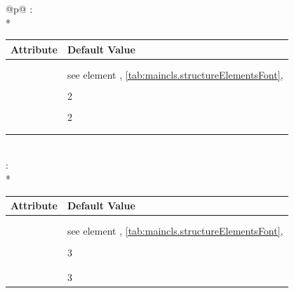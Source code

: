 \begin{longtable}{@{}p{\columnwidth}@{}}
    \addlinespace[\normalbaselineskip]
    : \\*
    \begin{tabularx}{\linewidth}{ll}
    \toprule
    Attribute & Default Value \\
    \midrule\nopagebreak
    \PValue{afterskip}   & \PValue{1.5ex plus .2ex} \\
    \PValue{beforeskip}  & \PValue{-3.25ex plus -1ex minus -.2ex} \\
    \PValue{font}        & see element
                           \DescRef{maincls.fontelement.subsection},
                           \autoref{tab:maincls.structureElementsFont},
                           \autopageref{tab:maincls.structureElementsFont} \\
    \PValue{indent}      & \PValue{0pt} \\
    \PValue{level}       & 2 \\
    \PValue{tocindent}   & \PValue{3.8em}\\
    \PValue{toclevel}    & 2 \\
    \PValue{tocnumwidth} & \PValue{3.2em}\\
    \PValue{tocstyle}    & \PValue{section} \\
    \bottomrule
    \end{tabularx} \\
    \addlinespace[\normalbaselineskip]
    : \\*
    \begin{tabularx}{\linewidth}{ll}
    \toprule
    Attribute & Default Value \\
    \midrule\nopagebreak
    \PValue{afterskip}   & \PValue{1.5ex plus .2ex} \\
    \PValue{beforeskip}  & \PValue{-3.25ex plus -1ex minus -.2ex} \\
    \PValue{font}        & see element
                           \DescRef{maincls.fontelement.subsubsection},
                           \autoref{tab:maincls.structureElementsFont},
                           \autopageref{tab:maincls.structureElementsFont} \\
    \PValue{indent}      & \PValue{0pt} \\
    \PValue{level}       & 3 \\
    \PValue{tocindent}   & \PValue{7.0em}\\
    \PValue{tocnumwidth} & \PValue{4.1em}\\
    \PValue{toclevel}    & 3 \\

\end{tabularx}
\end{longtable}
